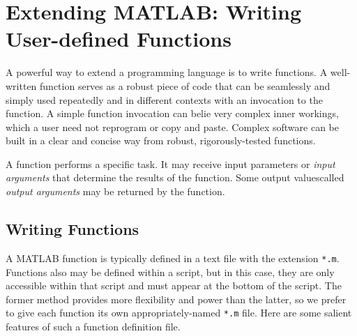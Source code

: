 
\section{Extending MATLAB: Writing User-defined Functions}

A powerful way to extend a programming language is to write functions. A well-written function serves as a robust piece of code that can be seamlessly and simply used repeatedly and in different contexts with an invocation to the function. A simple function invocation can belie very complex inner workings, which a user need not reprogram or copy and paste. Complex software can be built in a clear and concise way from robust, rigorously-tested functions.

A function performs a specific task. It may receive input parameters or \textit{input arguments} that determine the results of the function. Some output values\textemdash called \textit{output arguments} \textemdash may be returned by the function.

\subsection{Writing Functions}
A MATLAB function is typically defined in a text file with the extension \texttt{*.m}. Functions also may be defined within a script, but in this case, they are only accessible within that script and must appear at the bottom of the script. The former method provides more flexibility and power than the latter, so we prefer to give each function its own appropriately-named \texttt{*.m} file. Here are some salient features of such a function definition file.

